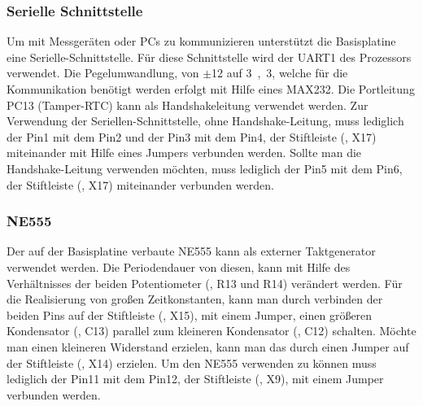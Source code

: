 
\subsubsection{Serielle Schnittstelle}
Um mit Messgeräten oder PCs zu kommunizieren unterstützt die \gls{Basisplatine} eine Serielle-Schnittstelle. Für diese Schnittstelle wird der UART1 des Prozessors verwendet. Die Pegelumwandlung, von $\pm$\unit{12}{\volt} auf \unit{3,3}{\volt}, welche für die Kommunikation benötigt werden erfolgt mit Hilfe eines MAX232. Die Portleitung PC13 (Tamper-RTC) kann als Handshakeleitung verwendet werden. Zur Verwendung der Seriellen-Schnittstelle, ohne Handshake-Leitung, muss lediglich der Pin1 mit dem Pin2 und der Pin3 mit dem Pin4, der Stiftleiste (, X17) miteinander mit Hilfe eines Jumpers verbunden werden. Sollte man die Handshake-Leitung verwenden möchten, muss lediglich der Pin5 mit dem Pin6, der Stiftleiste (, X17) miteinander verbunden werden.


\subsubsection{NE555}
Der auf der \gls{Basisplatine} verbaute NE555 kann als externer Taktgenerator verwendet werden. Die Periodendauer von diesen, kann mit Hilfe des Verhältnisses der beiden Potentiometer (, R13 und R14) verändert werden. Für die Realisierung von großen Zeitkonstanten, kann man durch verbinden der beiden Pins auf der Stiftleiste (, X15), mit einem Jumper, einen größeren Kondensator (, C13) parallel zum kleineren Kondensator (, C12) schalten. Möchte man einen kleineren Widerstand erzielen, kann man das durch einen Jumper auf der Stiftleiste (, X14) erzielen. Um den NE555 verwenden zu können muss lediglich der Pin11 mit dem Pin12, der Stiftleiste (, X9), mit einem Jumper verbunden werden.

